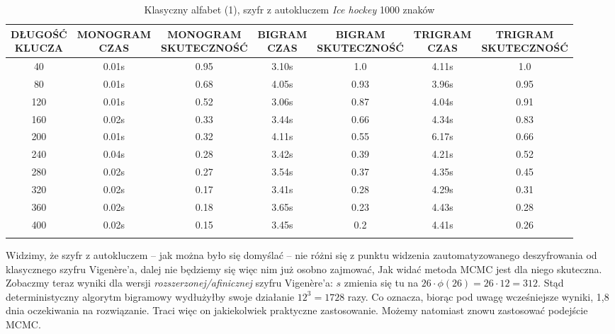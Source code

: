 \documentclass[a4paper]{article}
\theoremstyle{defn}
\theoremstyle{theorem}
\theoremstyle{lemma}
\theoremstyle{cor}
\theoremstyle{fact}
\begin{document}
\begin{center}\begin{small}\begin{longtable}{|c|c|c|c|c|c|c|}
\hline \makecell{DŁUGOŚĆ\\KLUCZA} &  \makecell{MONOGRAM\\CZAS} & \makecell{MONOGRAM\\SKUTECZNOŚĆ} & \makecell{BIGRAM\\CZAS} &  \makecell{BIGRAM\\SKUTECZNOŚĆ} & \makecell{TRIGRAM\\CZAS} & \makecell{TRIGRAM\\SKUTECZNOŚĆ}\\ \hline
40 & 0.01s & 0.95 & 3.10s & 1.0 & 4.11s & 1.0 \\ \hline
80 & 0.01s & 0.68 & 4.05s & 0.93 & 3.96s & 0.95 \\ \hline
120 & 0.01s & 0.52 & 3.06s & 0.87 & 4.04s & 0.91 \\ \hline
160 & 0.02s & 0.33 & 3.44s & 0.66 & 4.34s & 0.83 \\ \hline
200 & 0.01s & 0.32 & 4.11s & 0.55 & 6.17s & 0.66 \\ \hline
240 & 0.04s & 0.28 & 3.42s & 0.39 & 4.21s & 0.52 \\ \hline
280 & 0.02s & 0.27 & 3.54s & 0.37 & 4.35s & 0.45 \\ \hline
320 & 0.02s & 0.17 & 3.41s & 0.28 & 4.29s & 0.31 \\ \hline
360 & 0.02s & 0.18 & 3.65s & 0.23 & 4.43s & 0.28 \\ \hline
400 & 0.02s & 0.15 & 3.45s & 0.2 & 4.41s & 0.26 \\ \hline
\caption{Klasyczny alfabet (1), szyfr z autokluczem \textit{Ice hockey} 1000 znaków}
\end{longtable}\end{small}\end{center}
Widzimy, że szyfr z autokluczem – jak można było się domyślać – nie różni się z punktu widzenia zautomatyzowanego deszyfrowania od klasycznego szyfru Vigenère'a, dalej nie będziemy się więc nim już osobno zajmować, Jak widać metoda MCMC jest dla niego skuteczna.\\
Zobaczmy teraz wyniki dla wersji \textit{rozszerzonej/afinicznej} szyfru Vigenère'a: $s$ zmienia się tu na $26\cdot \phi(26) = 26 \cdot 12 = 312$. Stąd deterministyczny algorytm bigramowy wydłużyłby swoje działanie $12^3 = 1728$ razy. Co oznacza, biorąc pod uwagę wcześniejsze wyniki, 1,8 dnia oczekiwania na rozwiązanie. Traci więc on jakiekolwiek praktyczne zastosowanie. Możemy natomiast znowu zastosować podejście MCMC.
\end{document}
